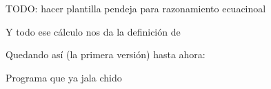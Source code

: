 

TODO: hacer plantilla pendeja para razonamiento ecuacinoal



Y todo ese cálculo nos da la definición de 


Quedando así (la primera versión) hasta ahora:


Programa que ya jala chido

\inputminted{haskell}{definiciones/kmp/1-op-raz-eq.hs}



